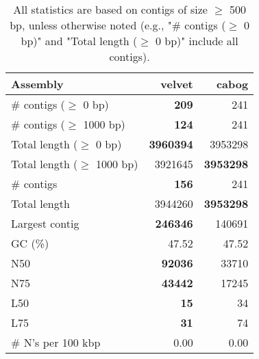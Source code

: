 \documentclass[12pt,a4paper]{article}
\begin{document}
\begin{table}[ht]
\begin{center}
\caption{All statistics are based on contigs of size $\geq$ 500 bp, unless otherwise noted (e.g., "\# contigs ($\geq$ 0 bp)" and "Total length ($\geq$ 0 bp)" include all contigs).}
\begin{tabular}{|l*{2}{|r}|}
\hline
Assembly & velvet & cabog \\ \hline
\# contigs ($\geq$ 0 bp) & {\bf 209} & 241 \\ \hline
\# contigs ($\geq$ 1000 bp) & {\bf 124} & 241 \\ \hline
Total length ($\geq$ 0 bp) & {\bf 3960394} & 3953298 \\ \hline
Total length ($\geq$ 1000 bp) & 3921645 & {\bf 3953298} \\ \hline
\# contigs & {\bf 156} & 241 \\ \hline
Total length & 3944260 & {\bf 3953298} \\ \hline
Largest contig & {\bf 246346} & 140691 \\ \hline
GC (\%) & 47.52 & 47.52 \\ \hline
N50 & {\bf 92036} & 33710 \\ \hline
N75 & {\bf 43442} & 17245 \\ \hline
L50 & {\bf 15} & 34 \\ \hline
L75 & {\bf 31} & 74 \\ \hline
\# N's per 100 kbp & 0.00 & 0.00 \\ \hline
\end{tabular}
\end{center}
\end{table}
\end{document}
